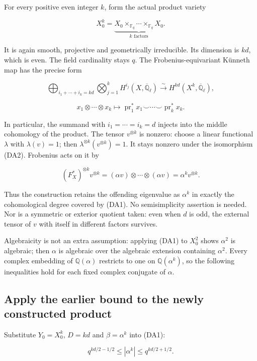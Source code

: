 For every positive even integer \(k\), form the actual product variety

\[X_0^k=\underbrace{X_0\times_{\mathbb F_q}\cdots\times_{\mathbb F_q}X_0}_{k\text{ factors}}.\]

It is again smooth, projective and geometrically irreducible. Its
dimension is \(kd\), which is even. The field cardinality stays
\textbf{\(q\)}. The Frobenius-equivariant Künneth map has the precise
form

\[\bigoplus_{i_1+\cdots+i_k=kd}\bigotimes_{j=1}^kH^{i_j}(X,\overline{\mathbb Q}_\ell)
\xrightarrow{\sim}H^{kd}(X^k,\overline{\mathbb Q}_\ell),\]

\[x_1\otimes\cdots\otimes x_k\longmapsto
\operatorname{pr}_1^*x_1\smile\cdots\smile\operatorname{pr}_k^*x_k.\tag{DA2}\]

In particular, the summand with \(i_1=\cdots=i_k=d\) injects into the
middle cohomology of the product. The tensor \(v^{\otimes k}\) is
nonzero: choose a linear functional \(\lambda\) with \(\lambda(v)=1\);
then \(\lambda^{\otimes k}(v^{\otimes k})=1\). It stays nonzero under
the isomorphism (DA2). Frobenius acts on it by

\[(F_X^*)^{\otimes k}v^{\otimes k}
=(\alpha v)\otimes\cdots\otimes(\alpha v)
=\alpha^k v^{\otimes k}.\tag{DA3}\]

Thus the construction retains the offending eigenvalue as \(\alpha^k\)
in exactly the cohomological degree covered by (DA1). No semisimplicity
assertion is needed. Nor is a symmetric or exterior quotient taken: even
when \(d\) is odd, the external tensor of \(v\) with itself in different
factors survives.

Algebraicity is not an extra assumption: applying (DA1) to \(X_0^2\)
shows \(\alpha^2\) is algebraic; then \(\alpha\) is algebraic over the
algebraic extension containing \(\alpha^2\). Every complex embedding of
\(\mathbb Q(\alpha)\) restricts to one on \(\mathbb Q(\alpha^k)\), so
the following inequalities hold for each fixed complex conjugate of
\(\alpha\).

\subsection{Apply the earlier bound to the newly constructed
product}\label{CFStage:apply-the-earlier-bound-to-the-newly-constructed-product}

Substitute \(Y_0=X_0^k\), \(D=kd\) and \(\beta=\alpha^k\) into (DA1):

\[q^{kd/2-1/2}\le |\alpha^k|\le q^{kd/2+1/2}.\tag{DA4}\]

